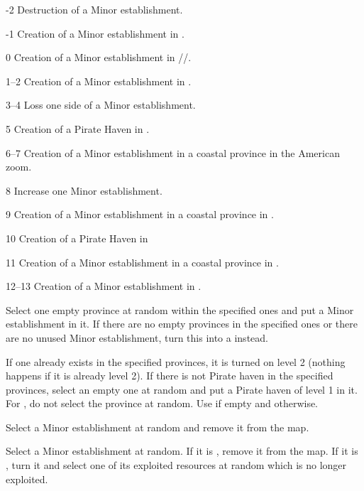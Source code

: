 \begin{modlist}[3em]
\item[-2] Destruction of a Minor establishment.
\item[-1] Creation of a Minor establishment in \continentBresil.
\item[0] Creation of a Minor establishment in
  \granderegionEcuador/\granderegionYucatan/\granderegionPanama.
\item[1--2] Creation of a Minor establishment in \continentCaraibes.
\item[3--4] Loss one side of a Minor establishment.
\item[5] Creation of a Pirate Haven in \continentCaraibes.
\item[6--7] Creation of a Minor establishment in a coastal province in the
  American zoom.
\item[8] Increase one Minor establishment.
\item[9] Creation of a Minor establishment in a coastal province in
  \continentIndia.
\item[10] Creation of a Pirate Haven in \granderegionMadagascar
\item[11] Creation of a Minor establishment in a coastal province in
  \continentIndia.
\item[12--13] Creation of a Minor establishment in \continentCaraibes.
\end{modlist}

 Select one empty province at
random within the specified ones and put a Minor establishment \Facemoins in
it.
\bparag If there are no empty provinces in the specified ones or there are no
unused Minor establishment, turn this into a  instead.

 If one already exists in the specified
provinces, it is turned on level 2 (nothing happens if it is already level 2).
\bparag If there is not Pirate haven in the specified provinces, select an
empty one at random and put a Pirate haven of level 1 in it.
\bparag For \granderegionMadagascar, do not select the province at random. Use
 if empty and  otherwise.

 Select a Minor establishment at
random and remove it from the map.

 Select a Minor establishment at random.
\bparag If it is \Facemoins, remove it from the map.
\bparag If it is \Faceplus, turn it \Facemoins and select one of its exploited
resources at random which is no longer exploited.

